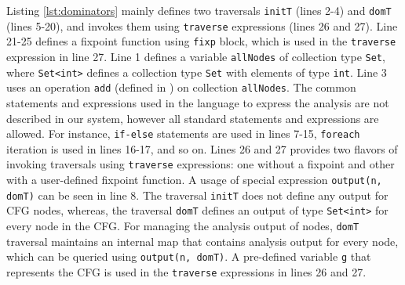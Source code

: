 Listing \ref{lst:dominators} mainly defines two traversals \lstinline|initT|
(lines 2-4) and \lstinline|domT| (lines 5-20), and invokes them using
\lstinline|traverse| expressions (lines 26 and 27). Line 21-25 defines a
fixpoint function using \lstinline|fixp| block, which is used in the
\lstinline|traverse| expression in line 27. Line 1 defines a variable
\lstinline|allNodes| of collection type \lstinline|Set|, where
\lstinline|Set<int>| defines a collection type \lstinline|Set| with elements of
type \lstinline|int|. Line 3 uses an operation \lstinline|add| (defined in
) on collection \lstinline|allNodes|. The common
statements and expressions used in the language to express the analysis are not
described in our system, however all standard statements and expressions are
allowed.
For instance, \lstinline|if-else| statements are used in lines 7-15,
\lstinline|foreach| iteration is used in lines 16-17, and so on.
Lines 26 and 27 provides two flavors of invoking traversals using
\lstinline|traverse| expressions: one without a fixpoint and other with a
user-defined fixpoint function. A usage of special expression
\lstinline|output(n, domT)| can be seen in line 8. The traversal
\lstinline|initT| does not define any output for CFG nodes, whereas, the
traversal \lstinline|domT| defines an output of type \lstinline|Set<int>| for
every node in the CFG. For managing the analysis output of nodes,
\lstinline|domT| traversal maintains an internal map that contains analysis
output for every node, which can be queried using \lstinline|output(n, domT)|.
A pre-defined variable \lstinline|g| that represents the CFG is used in the
\lstinline|traverse| expressions in lines 26 and 27.

